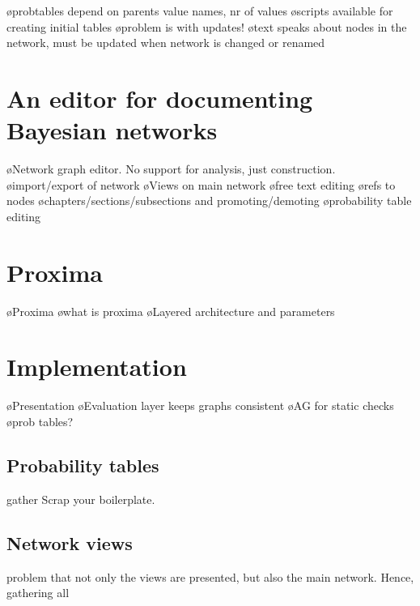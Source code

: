 \documentclass[preprint,natbib]{sigplanconf}
\begin{document}
\o probtables depend on parents value names, nr of values
\o scripts available for creating initial tables
\o problem is with updates!
\o text speaks about nodes in the network, must be updated when network is changed or renamed
\el



\section{An editor for documenting Bayesian networks}

\bl
\o Network graph editor. No support for analysis, just construction.
\o import/export of network
\o Views on main network
\o free text editing
\o refs to nodes
\o chapters/sections/subsections and promoting/demoting
\o probability table editing
\el



\section{Proxima}

\bl
\o Proxima
\o what is proxima
\el
\bl
\o Layered architecture and parameters
\el



\section{Implementation}

\bl
\o Presentation
\o Evaluation layer keeps graphs consistent
\o AG for static checks
\o prob tables?
\el

\subsection{Probability tables}

gather 
Scrap your boilerplate.

\subsection{Network views}
problem that not only the views are presented, but also the main network.
Hence, gathering all 
\end{document}
